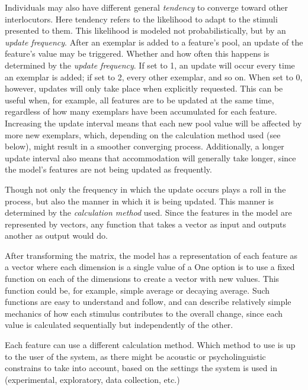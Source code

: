 Individuals may also have different general \textit{tendency} to converge toward other interlocutors.
Here tendency refers to the likelihood to adapt to the stimuli presented to them.
This likelihood is modeled not probabilistically, but by an \textit{update frequency}.
After an exemplar is added to a feature's pool, an update of the feature's value may be triggered.
Whether and how often this happens is determined by the \textit{update frequency}.
If set to 1, an update will occur every time an exemplar is added; if set to 2, every other exemplar, and so on.
When set to 0, however, updates will only take place when explicitly requested.
This can be useful when, for example, all features are to be updated at the same time, regardless of how many exemplars have been accumulated for each feature.
Increasing the update interval means that each new pool value will be affected by more new exemplars, which, depending on the calculation method used (see below), might result in a smoother converging process.
Additionally, a longer update interval also means that accommodation will generally take longer, since the model's features are not being updated as frequently.

Though not only the frequency in which the update occurs plays a roll in the process, but also the manner in which it is being updated.
This manner is determined by the \textit{calculation method} used.
Since the features in the model are represented by vectors, any function that takes a vector as input and outputs another as output would do.

After transforming the matrix, the model has a representation of each feature as a vector where each dimension is a single value of a 
One option is to use a fixed function on each of the dimensions to create a vector with new values.
This function could be, for example, simple average or decaying average.
Such functions are easy to understand and follow, and can describe relatively simple mechanics of how each stimulus contributes to the overall change, since each value is calculated sequentially but independently of the other.

Each feature can use a different calculation method.
Which method to use is up to the user of the system, as there might be acoustic or psycholinguistic constrains to take into account, based on the settings the system is used in (experimental, exploratory, data collection, etc.)


